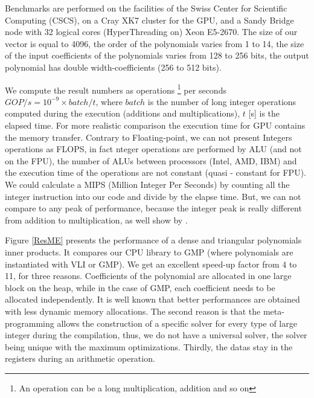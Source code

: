 \documentclass[oribibl]{llncs2e/llncs}
\begin{document}
Benchmarks are performed on the facilities of the Swiss Center for Scientific Computing (CSCS), on a Cray  XK7 cluster for the GPU, and a Sandy Bridge  node with 32 logical cores  (HyperThreading on) Xeon E5-2670. The size of our vector is equal to 4096, the order of the polynomials varies from 1 to 14, the size of the input coefficients of the polynomials varies from 128 to 256 bits, the output polynomial has double width-coefficients (256 to 512 bits). 

We compute the  result  numbers as operations \footnote{An operation can be a long multiplication, addition and so on}   per seconds $GOP/s=10^{-9} \times batch/t$, where  $batch$ is the number of long integer operations computed during the execution (additions and multiplications), $t$ [s]  is the elapsed time. For more realistic comparison the execution time for GPU contains the memory  transfer. Contrary to Floating-point, we can not present Integers operations as FLOPS, in fact nteger operations are performed by ALU (and not on the FPU),  the number of  ALUs  between processors (Intel, AMD, IBM) and the execution time of the operations are  not constant \cite{ASMcost} (quasi - constant for FPU). We could calculate a MIPS (Million Integer Per Seconds) by counting all the integer instruction into our code and divide by the elapse time. But, we can not compare to any peak of performance, because the integer peak is really different from addition to multiplication, as well show by \cite{Vladimirov2012}. 

Figure \ref{ResME} presents the performance of a dense and triangular polynomials inner products. It compares our CPU library to GMP (where polynomials are  instantiated with VLI or GMP). We get an excellent speed-up factor from 4 to 11, for three reasons.
Coefficients of the  polynomial are allocated in one large block on the heap, while in the case of GMP, each coefficient needs to be allocated independently. It is well known that better performances are obtained with less dynamic memory allocations. The second reason is that  the meta-programming allows the construction of a specific solver for every type of large integer during the compilation, thus, we do not have a universal solver, the solver being unique with the maximum optimizations. Thirdly, the datas stay in the registers during an arithmetic operation.
  
\end{document}

